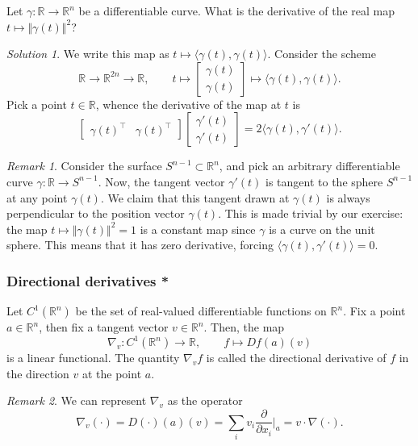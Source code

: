 \documentclass[11pt]{article}
\newcommand{\R}{\mathbb{R}}
\newcommand{\ip}[2]{\langle #1, #2 \rangle}
\newcommand{\norm}[1]{\Vert #1 \Vert}
\newcommand{\pp}[2]{\frac{\partial #1}{\partial #2}}
\newcommand{\grad}{\nabla}
\theoremstyle{definition}
\theoremstyle{remark}
\newtheorem*{remark}{Remark}
\newtheorem*{solution}{Solution}
\numberwithin{equation}{section}
\begin{document}
    \begin{exercise}
        Let $\gamma\colon \R \to \R^n$ be a differentiable curve. What is the
        derivative of the real map $t \mapsto \norm{\gamma(t)}^2$?
        \begin{solution}
            We write this map as $t \mapsto \ip{\gamma(t)}{\gamma(t)}$. Consider the
            scheme \[
                \R \to \R^{2n} \to \R, \qquad
                t \mapsto \begin{bmatrix}
                    \gamma(t) \\ \gamma(t)
                \end{bmatrix} \mapsto \ip{\gamma(t)}{\gamma(t)}.
            \] Pick a point $t\in \R$, whence the derivative of the map at $t$ is \[
                \begin{bmatrix}
                    \gamma(t)^\top & \gamma(t)^\top
                \end{bmatrix} \begin{bmatrix}
                    \gamma'(t) \\ \gamma'(t)
                \end{bmatrix} = 2\ip{\gamma(t)}{\gamma'(t)}.
            \] 
        \end{solution}
        \begin{remark}
            Consider the surface $S^{n - 1} \subset \R^n$, and pick an arbitrary
            differentiable curve $\gamma\colon \R \to S^{n - 1}$. Now, the tangent
            vector $\gamma'(t)$ is tangent to the sphere $S^{n - 1}$ at any point
            $\gamma(t)$. We claim that this tangent drawn at $\gamma(t)$ is always
            perpendicular to the position vector $\gamma(t)$. This is made trivial by
            our exercise: the map $t \mapsto \norm{\gamma(t)}^2 = 1$ is a constant
            map since $\gamma$ is a curve on the unit sphere. This means that it has
            zero derivative, forcing $\ip{\gamma(t)}{\gamma'(t)} = 0$.
        \end{remark}
    \end{exercise}

    \subsubsection{Directional derivatives *}

    \begin{definition}
        Let $C^1(\R^n)$ be the set of real-valued differentiable functions on $\R^n$.
        Fix a point $a \in \R^n$, then fix a tangent vector $v \in \R^n$. Then, the
        map \[
            \grad_v\colon C^1(\R^n) \to \R, \qquad f\mapsto Df(a)(v)
        \] is a linear functional. The quantity $\grad_v f$ is called the
        directional derivative of $f$ in the direction $v$ at the point $a$.
        \begin{remark}
            We can represent $\grad_v$ as the operator \[
                \grad_v (\cdot) = D(\cdot)(a)(v) = \sum_i v_i \pp{}{x_i}\Big|_a =
                v\cdot \grad (\cdot).
            \]
        \end{remark}
    \end{definition}
\end{document}
